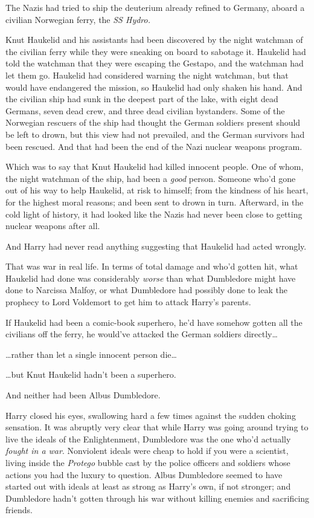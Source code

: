 The Nazis had tried to ship the deuterium already refined to Germany, aboard a 
civilian Norwegian ferry, the \emph{SS Hydro.}

Knut Haukelid and his assistants had been discovered by the night watchman of 
the civilian ferry while they were sneaking on board to sabotage it. Haukelid 
had told the watchman that they were escaping the Gestapo, and the watchman had 
let them go. Haukelid had considered warning the night watchman, but that would 
have endangered the mission, so Haukelid had only shaken his hand. And the 
civilian ship had sunk in the deepest part of the lake, with eight dead 
Germans, seven dead crew, and three dead civilian bystanders. Some of the 
Norwegian rescuers of the ship had thought the German soldiers present should 
be left to drown, but this view had not prevailed, and the German survivors had 
been rescued. And that had been the end of the Nazi nuclear weapons program.

Which was to say that Knut Haukelid had killed innocent people. One of whom, 
the night watchman of the ship, had been a \emph{good} person. Someone who'd 
gone out of his way to help Haukelid, at risk to himself; from the kindness of 
his heart, for the highest moral reasons; and been sent to drown in turn. 
Afterward, in the cold light of history, it had looked like the Nazis had never 
been close to getting nuclear weapons after all.

And Harry had never read anything suggesting that Haukelid had acted wrongly.

That was war in real life. In terms of total damage and who'd gotten hit, what 
Haukelid had done was considerably \emph{worse} than what Dumbledore might have 
done to Narcissa Malfoy, or what Dumbledore had possibly done to leak the 
prophecy to Lord Voldemort to get him to attack Harry's parents.

If Haukelid had been a comic-book superhero, he'd have somehow gotten all the 
civilians off the ferry, he would've attacked the German soldiers 
directly{\ldots}

{\ldots}rather than let a single innocent person die{\ldots}

{\ldots}but Knut Haukelid hadn't been a superhero.

And neither had been Albus Dumbledore.

Harry closed his eyes, swallowing hard a few times against the sudden choking 
sensation. It was abruptly very clear that while Harry was going around trying 
to live the ideals of the Enlightenment, Dumbledore was the one who'd actually 
\emph{fought in a war}. Nonviolent ideals were cheap to hold if you were a 
scientist, living inside the \emph{Protego} bubble cast by the police officers 
and soldiers whose actions you had the luxury to question. Albus Dumbledore 
seemed to have started out with ideals at least as strong as Harry's own, if 
not stronger; and Dumbledore hadn't gotten through his war without killing 
enemies and sacrificing friends.

